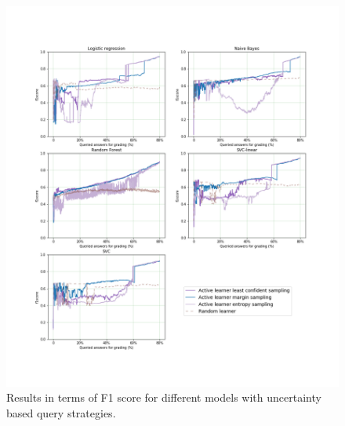 	\begin{figure}[!htb]
		\centering
		\includegraphics[scale=0.45]{images/task1_f1score_uncertainty}
		\caption{Results in terms of F1 score for different models with uncertainty based query strategies.}
		\label{t1_m_uncertainty_f1}
	\end{figure}
	
